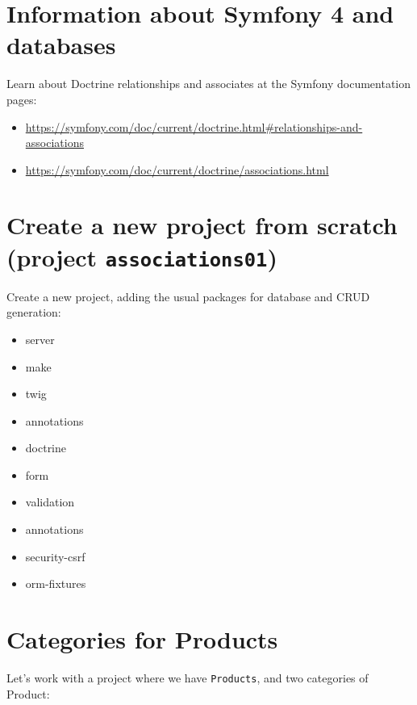 \documentclass[a4paperpaper,openright]{book}
\providecommand{\tightlist}{%
  \setlength{\itemsep}{0pt}\setlength{\parskip}{0pt}}
\begin{document}
\hypertarget{information-about-symfony-4-and-databases}{%
\section{Information about Symfony 4 and
databases}\label{information-about-symfony-4-and-databases}}

Learn about Doctrine relationships and associates at the Symfony
documentation pages:

\begin{itemize}
\item
  \url{https://symfony.com/doc/current/doctrine.html\#relationships-and-associations}
\item
  \url{https://symfony.com/doc/current/doctrine/associations.html}
\end{itemize}

\hypertarget{create-a-new-project-from-scratch-project-associations01}{%
\section{\texorpdfstring{Create a new project from scratch (project
\texttt{associations01})}{Create a new project from scratch (project associations01)}}\label{create-a-new-project-from-scratch-project-associations01}}

Create a new project, adding the usual packages for database and CRUD
generation:

\begin{itemize}
\tightlist
\item
  server
\item
  make
\item
  twig
\item
  annotations
\item
  doctrine
\item
  form
\item
  validation
\item
  annotations
\item
  security-csrf
\item
  orm-fixtures
\end{itemize}

\hypertarget{categories-for-products}{%
\section{Categories for Products}\label{categories-for-products}}

Let's work with a project where we have \texttt{Products}, and two
categories of Product:
\end{document}
